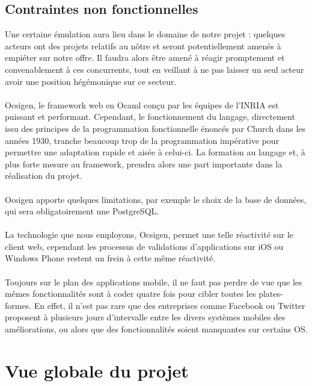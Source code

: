 \documentclass{life-fr}
\begin{document}
\section{Contraintes non fonctionnelles}

Une certaine émulation aura lieu dans le domaine de notre projet : quelques acteurs ont des projets relatifs au nôtre et seront potentiellement amenés à empiéter sur notre offre. Il faudra alors être amené à réagir promptement et convenablement à ces concurrents, tout en veillant à ne pas laisser un seul acteur avoir une position hégémonique sur ce secteur.\\
\\
Ocsigen, le framework web en Ocaml conçu par les équipes de l'INRIA est puissant et performant. Cependant, le fonctionnement du langage, directement issu des principes de la programmation fonctionnelle énoncés par Church dans les années 1930, tranche beaucoup trop de la programmation impérative pour permettre une adaptation rapide et aisée à celui-ci. La formation au langage et, à plus forte mesure au framework, prendra alors une part importante dans la réalisation du projet. \\
\\
Ocsigen apporte quelques limitations, par exemple le choix de la base de données, qui sera obligatoirement une PostgreSQL.\\
\\
La technologie que nous employons, Ocsigen, permet une telle réactivité sur le client web, cependant les processus de validations d'applications sur iOS ou Windows Phone restent un frein à cette même réactivité. \\
\\
Toujours sur le plan des applications mobile, il ne faut pas perdre de vue que les mêmes fonctionnalités sont à coder quatre fois pour cibler toutes les plates-formes. En effet, il n'est pas rare que des entreprises comme Facebook ou Twitter proposent à plusieurs jours d'intervalle entre les divers systèmes mobiles des améliorations, ou alors que des fonctionnalités soient manquantes sur certains OS.


\chapter{Vue globale du projet}
\end{document}
